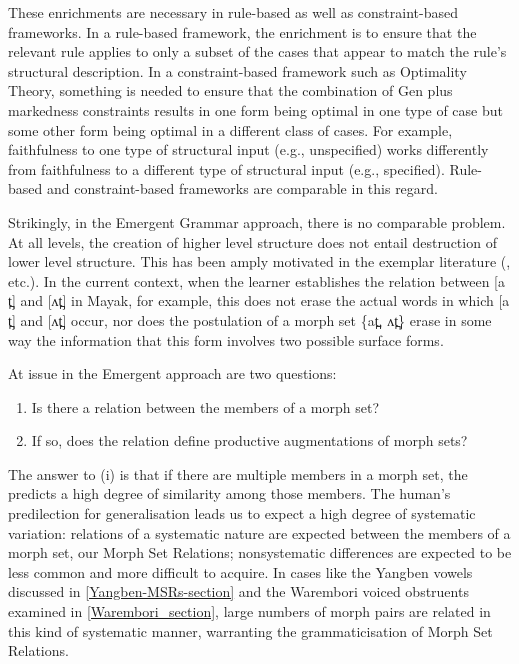 These enrichments are necessary  in rule-based as well as constraint-based frameworks. In a rule-based framework, the enrichment is to ensure that the relevant rule applies to only a subset of the cases that appear to match the rule's structural description. In a constraint-based framework such as Optimality Theory, something is needed to ensure that the combination of Gen plus markedness constraints results in one form being optimal in one type of case but some other form being optimal in a different class of cases. For example, faithfulness to one type of structural input (e.g., unspecified) works differently from faithfulness to a different type of structural input (e.g., specified). Rule-based and constraint-based frameworks are comparable in this regard.

Strikingly, in the Emergent Grammar approach, there is no comparable problem. At all levels, the creation of higher level structure does not entail destruction of lower level structure. This has been amply motivated in the exemplar literature (\citealt{Pierrehumbert:2001ed, Pierrehumbert:2003PhoneticDiversity}, etc.). In the current context, when the learner establishes the relation between [a​t̪] and [ʌ​t̪] in Mayak, for example, this does not erase the actual words in which [a​t̪] and [ʌ​t̪] occur, nor does the postulation of a morph set \{a​t̪, ʌ​t̪\} erase in some way the information that this form involves two possible surface forms.

 
At issue in the Emergent approach are two questions:

\begin{enumerate}[label=(\roman*),noitemsep,topsep=0pt]
\item Is there a  relation between the members of a morph set?  
\item If so, does the relation define productive augmentations of morph sets? 
\end{enumerate}

The answer to (i) is that if there are multiple members in a morph set, the {\Identity} predicts a high degree of similarity among those members. The human's predilection for generalisation leads us to expect a high degree of systematic variation: relations of a systematic nature are expected between the members of a morph set, our Morph Set Relations; nonsystematic differences are expected to be less common and more difficult to acquire. In cases like the Yangben vowels discussed in \Sec\ref{Yangben-MSRs-section} and the Warembori voiced obstruents examined in \Sec\ref{Warembori_section}, large numbers of morph pairs are related in this kind of systematic manner, warranting the grammaticisation of Morph Set Relations.\largerpage


